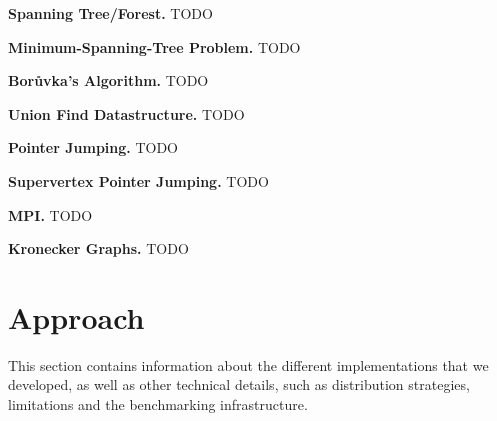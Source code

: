 \documentclass[letterpaper]{article}
\newcommand{\mypar}[1]{{\bf #1.}}
\begin{document}
\mypar{Spanning Tree/Forest}
TODO

\mypar{Minimum-Spanning-Tree Problem}
TODO

\mypar{Bor\r{u}vka's Algorithm}
TODO

\mypar{Union Find Datastructure}
TODO

\mypar{Pointer Jumping}
TODO

\mypar{Supervertex Pointer Jumping}
TODO

\mypar{MPI}
TODO

\mypar{Kronecker Graphs}
TODO \cite{leskovec2010kronecker}

%
%
%


\section{Approach}
\label{sec:approach}



This section contains information about the different implementations that we developed, as well as other technical
details, such as distribution strategies, limitations and the benchmarking infrastructure.
\end{document}
